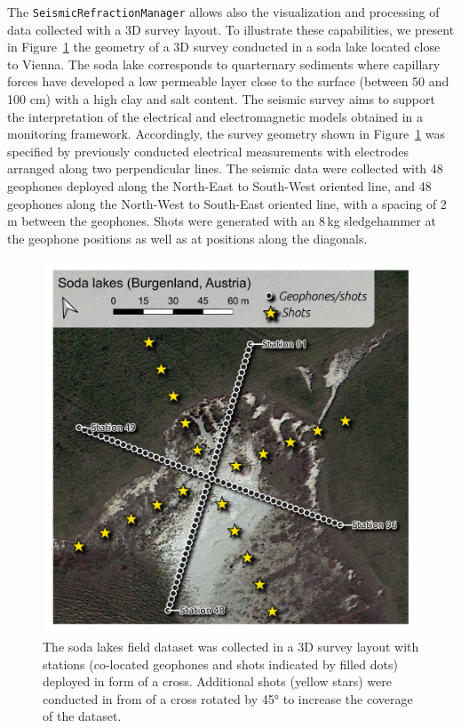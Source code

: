 \documentclass[a4paper,fleqn]{cas-sc}
\begin{document}
The \texttt{SeismicRefractionManager} allows also the visualization and processing of data collected with a 3D survey layout. To illustrate these capabilities, we present in Figure~\ref{fig:map_sodalakes} the geometry of a 3D survey conducted in a soda lake located close to Vienna. The soda lake corresponds to quarternary sediments where capillary forces have developed a low permeable layer close to the surface (between 50 and 100 cm) with a high clay and salt content.
The seismic survey aims to support the interpretation of the electrical and electromagnetic models obtained in a monitoring framework. 
Accordingly, the survey geometry shown in Figure~\ref{fig:map_sodalakes} was specified by previously conducted electrical measurements with electrodes arranged along two perpendicular lines. The seismic data were collected with 48 geophones deployed along the North-East to South-West oriented line, and 48 geophones along the North-West to South-East oriented line, with a spacing of 2\,m between the geophones. Shots were generated with an 8\,kg sledgehammer at the geophone positions as well as at positions along the diagonals.

\begin{figure}
	\centering
	\includegraphics[width=.75\textwidth]{./figures/map_sodalakes.pdf}
	\caption{The soda lakes field dataset was collected in a 3D survey layout with stations (co-located geophones and shots indicated by filled dots) deployed in form of a cross. Additional shots (yellow stars) were conducted in from of a cross rotated by 45° to increase the coverage of the dataset.}
	\label{fig:map_sodalakes}
\end{figure}
\end{document}
